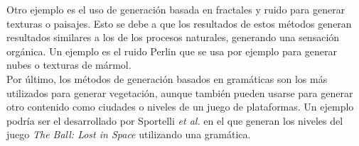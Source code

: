 Otro ejemplo es el uso de generación basada en fractales y ruido para generar texturas o paisajes. Esto se debe a que los resultados de estos métodos generan resultados similares a los de los procesos naturales, generando una sensación orgánica. Un ejemplo es el ruido Perlin \cite{perlin} que se usa por ejemplo para generar nubes o texturas de mármol.\\

Por último, los métodos de generación basados en gramáticas son los más utilizados para generar vegetación, aunque también pueden usarse para generar otro contenido como ciudades o niveles de un juego de plataformas. Un ejemplo podría ser el desarrollado por Sportelli \textit{et al.} \cite{sportelli2014} en el que generan los niveles del juego \textit{The Ball: Lost in Space} utilizando una gramática.\\

